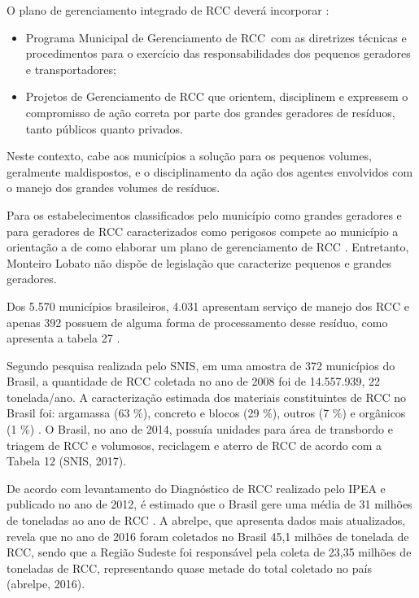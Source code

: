 	O plano de gerenciamento integrado de RCC deverá incorporar \cite{conama:307}:
	
	\begin{itemize}
		\item Programa Municipal de Gerenciamento de RCC com as diretrizes técnicas e procedimentos para o exercício das responsabilidades dos pequenos geradores e transportadores;
		\item Projetos de Gerenciamento de RCC que orientem, disciplinem e expressem o compromisso de ação correta por parte dos grandes geradores de resíduos, tanto públicos quanto privados.
	\end{itemize}

	Neste contexto, cabe aos municípios a solução para os pequenos volumes, geralmente maldispostos, e o disciplinamento da ação dos agentes envolvidos com o manejo dos grandes volumes de resíduos.

	Para os estabelecimentos classificados pelo município como grandes geradores e para geradores de RCC caracterizados como perigosos compete ao município a orientação a de como elaborar um plano de gerenciamento de RCC \cite{brasil:12305}. Entretanto, Monteiro Lobato não dispõe de legislação que caracterize pequenos e grandes geradores.

	Dos 5.570 municípios brasileiros, 4.031 apresentam serviço de manejo dos RCC e apenas 392 possuem de alguma forma de processamento desse resíduo, como apresenta a tabela 27 \cite{IPEA2012b}. 
	
	
	
	Segundo pesquisa realizada pelo SNIS, em uma amostra de 372 municípios do Brasil, a quantidade de RCC coletada no ano de 2008 foi de 14.557.939, 22 tonelada/ano. A caracterização estimada dos materiais constituintes de RCC no Brasil foi: argamassa (63 \%), concreto e blocos (29 \%), outros (7 \%) e orgânicos (1 \%) \cite{IPEA2012b}. O Brasil, no ano de 2014, possuía unidades para área de transbordo e triagem de RCC e volumosos, reciclagem e aterro de RCC de acordo com a Tabela 12 (SNIS, 2017). 
	
	
	
	De acordo com levantamento do Diagnóstico de RCC realizado pelo IPEA e publicado no ano de 2012, é estimado que o Brasil gere uma média de 31 milhões de toneladas ao ano de RCC \cite{IPEA2012b}. A \gls{abrelpe}, que apresenta dados mais atualizados, revela que no ano de 2016 foram coletados no Brasil 45,1 milhões de tonelada de RCC, sendo que a Região Sudeste foi responsável pela coleta de 23,35 milhões de toneladas de RCC, representando quase metade do total coletado no país (\gls{abrelpe}, 2016).	
	
